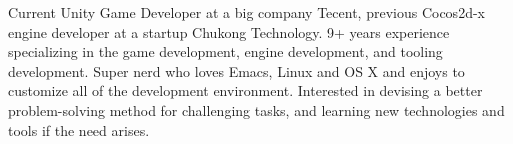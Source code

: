 

\begin{cvparagraph}

Current Unity Game Developer at a big company Tecent, previous Cocos2d-x engine
developer at a startup Chukong Technology. 9+ years experience specializing in
the game development, engine development, and tooling development. Super nerd
who loves Emacs, Linux and OS X and enjoys to customize all of the development
environment. Interested in devising a better problem-solving method for
challenging tasks, and learning new technologies and tools if the need arises.
\end{cvparagraph}
